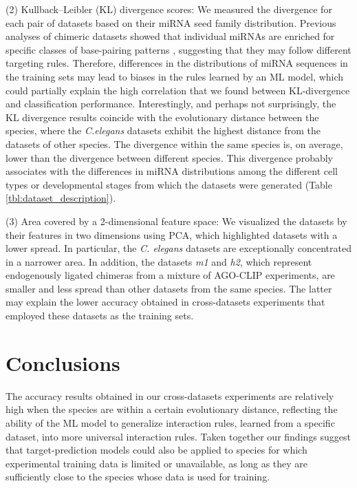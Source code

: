 \documentclass{bmcart}
\begin{document}
(2) Kullback–Leibler (KL) divergence scores: We measured the divergence for each pair of datasets based on their miRNA seed family distribution. Previous analyses of chimeric datasets showed that individual miRNAs are enriched for specific classes of base-pairing patterns \cite{helwak2013mapping, broughton2016pairing}, suggesting that they may follow different targeting rules.
Therefore, differences in the distributions of miRNA sequences in the training sets may lead to biases in the rules learned by an ML model, which could partially explain the high correlation that we found between KL-divergence and classification performance.  
Interestingly, and perhaps not surprisingly, the KL divergence results coincide with the evolutionary distance between the species, where the \textit{C.elegans} datasets exhibit the highest distance from the datasets of other species. The divergence within the same species is, on average, lower than the divergence between different species. This divergence probably associates with the differences in miRNA distributions among the different cell types or developmental stages from which the datasets were generated (Table \ref{tbl:dataset_description}). 

(3) Area covered by a 2-dimensional feature space: We visualized the datasets by their features in two dimensions using PCA, which highlighted datasets with a lower spread. In particular, the \textit{C. elegans} datasets are exceptionally concentrated in a narrower area. In addition, the datasets \textit{m1} and \textit{h2}, which represent endogenously ligated chimeras from a mixture of AGO-CLIP experiments, are smaller and less spread than other datasets from the same species. The latter may explain the lower accuracy obtained in cross-datasets experiments that employed these datasets as the training sets.


\section*{Conclusions}
The accuracy results obtained in our cross-datasets experiments are relatively high when the species are within a certain evolutionary distance, reflecting the ability of the ML model to generalize interaction rules, learned from a specific dataset, into more universal interaction rules. Taken together our findings suggest that target-prediction models could also be applied to species for which experimental training data is limited or unavailable, as long as they are sufficiently close to the species whose data is used for training.
\end{document}
